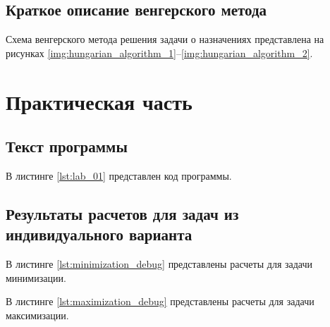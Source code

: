\documentclass{bmstu}
\begin{document}
\section{Краткое описание венгерского метода}

Схема венгерского метода решения задачи о назначениях представлена на рисунках \ref{img:hungarian_algorithm_1}--\ref{img:hungarian_algorithm_2}. 



\chapter{Практическая часть}

\section{Текст программы}

В листинге \ref{lst:lab_01} представлен код программы.


\clearpage

\section{Результаты расчетов для задач из индивидуального варианта}

В листинге \ref{lst:minimization_debug} представлены расчеты для задачи минимизации.


В листинге \ref{lst:maximization_debug} представлены расчеты для задачи максимизации.

\end{document}
